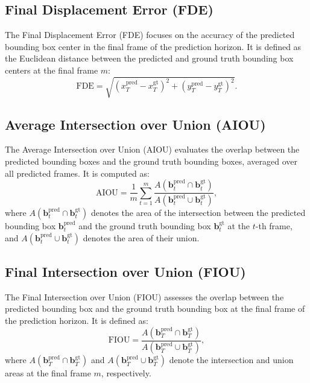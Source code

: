 \documentclass[12pt,oneside]{book} %
\begin{document}
\subsection*{Final Displacement Error (FDE)}
The Final Displacement Error (FDE) focuses on the accuracy of the predicted
bounding box center in the final frame of the prediction horizon. It is defined
as the Euclidean distance between the predicted and ground truth bounding box
centers at the final frame \(m\):
\begin{equation}
    \text{FDE} = \sqrt{(x_T^{\text{pred}} - x_T^{\text{gt}})^2 + (y_T^{\text{pred}} - y_T^{\text{gt}})^2}.
\end{equation}

\subsection*{Average Intersection over Union (AIOU)}
The Average Intersection over Union (AIOU) evaluates the overlap between the
predicted bounding boxes and the ground truth bounding boxes, averaged over all
predicted frames. It is computed as:
\begin{equation}
    \text{AIOU} = \frac{1}{m} \sum_{t=1}^{m} \frac{A(\mathbf{b}_t^{\text{pred}} \cap \mathbf{b}_t^{\text{gt}})}{A(\mathbf{b}_t^{\text{pred}} \cup \mathbf{b}_t^{\text{gt}})},
\end{equation}
where \(A(\mathbf{b}_t^{\text{pred}} \cap \mathbf{b}_t^{\text{gt}})\) denotes the area of the intersection between the predicted bounding box \(\mathbf{b}_t^{\text{pred}}\) and the ground truth bounding box \(\mathbf{b}_t^{\text{gt}}\) at the \(t\)-th frame, and \(A(\mathbf{b}_t^{\text{pred}} \cup \mathbf{b}_t^{\text{gt}})\) denotes the area of their union.

\subsection*{Final Intersection over Union (FIOU)}
The Final Intersection over Union (FIOU) assesses the overlap between the
predicted bounding box and the ground truth bounding box at the final frame of
the prediction horizon. It is defined as:
\begin{equation}
    \text{FIOU} = \frac{A(\mathbf{b}_T^{\text{pred}} \cap \mathbf{b}_T^{\text{gt}})}{A(\mathbf{b}_T^{\text{pred}} \cup \mathbf{b}_T^{\text{gt}})},
\end{equation}
where \(A(\mathbf{b}_T^{\text{pred}} \cap \mathbf{b}_T^{\text{gt}})\) and \(A(\mathbf{b}_T^{\text{pred}} \cup \mathbf{b}_T^{\text{gt}})\) denote the intersection and union areas at the final frame \(m\), respectively.
\end{document}
